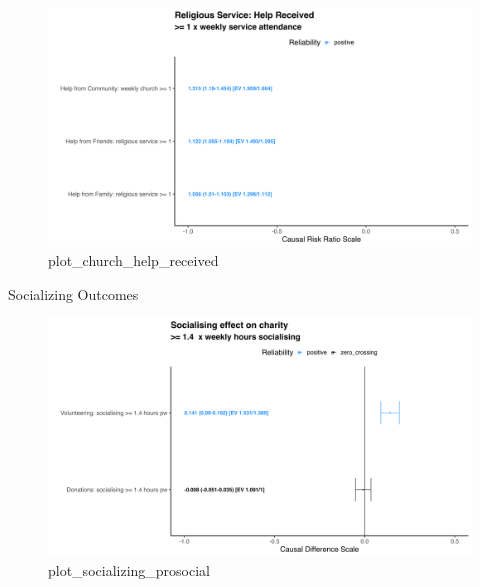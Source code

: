 \documentclass[
  ignorenonframetext,
  aspectratio=169,
]{beamer}
\begin{document}
\begin{frame}
\begin{figure}[H]

{\centering \includegraphics{plot_church_help_received.png}

}

\caption{plot\_church\_help\_received}

\end{figure}%
\end{frame}

\begin{frame}{Socializing Outcomes}
\label{socializing-outcomes}
\end{frame}

\begin{frame}
\begin{figure}[H]

{\centering \includegraphics{plot_socializing_prosocial.png}

}

\caption{plot\_socializing\_prosocial}

\end{figure}%
\end{frame}
\end{document}
